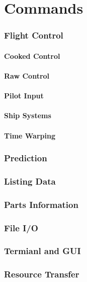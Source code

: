 \part{Commands}
	\section{Flight Control}
		\subsection{Cooked Control}
		\subsection{Raw Control}
		\subsection{Pilot Input}
		\subsection{Ship Systems}
		\subsection{Time Warping}
	\section{Prediction}
	\section{Listing Data}
	\section{Parts Information}
	\section{File I/O}
	\section{Termianl and GUI}
	\section{Resource Transfer}